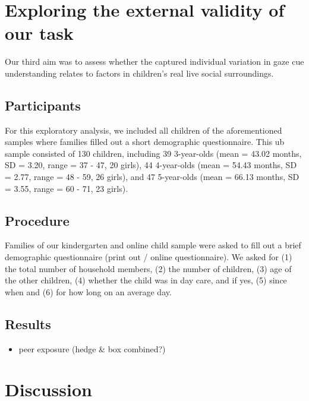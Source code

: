 \documentclass[
  man,floatsintext]{apa6}
\providecommand{\tightlist}{%
  \setlength{\itemsep}{0pt}\setlength{\parskip}{0pt}}
\begin{document}
\hypertarget{exploring-the-external-validity-of-our-task}{%
\section{Exploring the external validity of our task}\label{exploring-the-external-validity-of-our-task}}

Our third aim was to assess whether the captured individual variation in gaze cue understanding relates to factors in children's real live social surroundings.

\hypertarget{participants-2}{%
\subsection{Participants}\label{participants-2}}

For this exploratory analysis, we included all children of the aforementioned samples where families filled out a short demographic questionnaire. This ub sample consisted of
130 children, including
39 3-year-olds
(mean = 43.02 months,
SD = 3.20,
range = 37
- 47,
20 girls),
44 4-year-olds
(mean = 54.43 months,
SD = 2.77,
range = 48
- 59,
26 girls),
and 47 5-year-olds
(mean = 66.13 months,
SD = 3.55,
range = 60
- 71,
23 girls).

\hypertarget{procedure-3}{%
\subsection{Procedure}\label{procedure-3}}

Families of our kindergarten and online child sample were asked to fill out a brief demographic questionnaire (print out / online questionnaire). We asked for (1) the total number of household members, (2) the number of children, (3) age of the other children, (4) whether the child was in day care, and if yes, (5) since when and (6) for how long on an average day.

\hypertarget{results-5}{%
\subsection{Results}\label{results-5}}

\begin{itemize}
\tightlist
\item
  peer exposure (hedge \& box combined?)
\end{itemize}

\hypertarget{discussion-2}{%
\section{Discussion}\label{discussion-2}}
\end{document}
